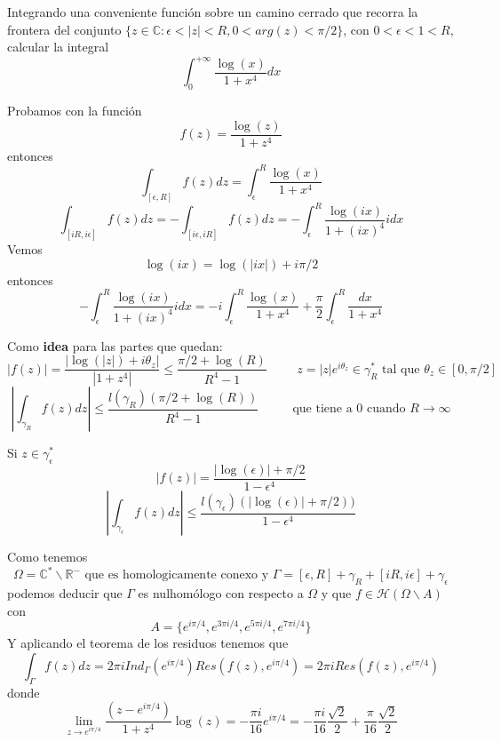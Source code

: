 \begin{ejer}
	Integrando una conveniente función sobre un camino cerrado que recorra la frontera del conjunto $\{ z\in\mathbb{C} : \epsilon < |z| < R, 0<arg(z)<\pi/2 \}$, con $0<\epsilon<1<R$, calcular la integral
	$$ \int_{0}^{+\infty} \frac{\log(x)}{1+x^4}dx $$
\end{ejer}
\begin{sol}
Probamos con la función
$$ f(z) = \frac{\log(z)}{1+z^4} $$
entonces
$$ \int_{[\epsilon, R]}f(z)dz = \int_{\epsilon}^{R} \frac{\log(x)}{1+x^4} $$
$$ \int_{[iR,i\epsilon]} f(z)dz = -\int_{[i\epsilon,iR]} f(z)dz = -\int_{\epsilon}^{R} \frac{\log(ix)}{1+(ix)^4} idx $$
Vemos
$$ \log(ix) = \log(|ix|)+i\pi/2 $$
entonces
$$ -\int_{\epsilon}^{R} \frac{\log(ix)}{1+(ix)^4} idx = -i\int_{\epsilon}^{R} \frac{\log(x)}{1+x^4} + \frac{\pi}{2} \int_{\epsilon}^{R} \frac{dx}{1+x^4} $$

Como \textbf{idea} para las partes que quedan:
$$ |f(z)| = \frac{|\log(|z|)+i\theta_z|}{|1+z^4|} \leq \frac{\pi/2+\log(R)}{R^4-1} \hspace{1cm} z=|z|e^{i\theta_z} \in\gamma_R^{\ast} \text{ tal que }\theta_z\in[0,\pi/2]$$
$$ \left| \int_{\gamma_R}f(z)dz \right| \leq \frac{l(\gamma_R)(\pi/2+\log(R))}{R^4-1} \hspace{1cm}\text{ que tiene a 0 cuando $R\rightarrow\infty$} $$

Si $z\in\gamma_{\epsilon}^{\ast}$
$$ |f(z)| = \frac{|\log(\epsilon)|+\pi/2}{1-\epsilon^4} $$
$$ \left| \int_{\gamma_{\epsilon}} f(z)dz \right| \leq \frac{l(\gamma_{\epsilon}) (|\log(\epsilon)|+\pi/2))}{1-\epsilon^4}  $$

Como tenemos
$$ \Omega = \mathbb{C}^{\ast}\backslash\mathbb{R}^- \text{ que es homologicamente conexo y }\Gamma = [\epsilon,R] +\gamma_R + [iR,i\epsilon] +\gamma_{\epsilon} $$
podemos deducir que
$\Gamma$ es nulhomólogo con respecto a $\Omega$ y que $f\in\mathcal{H}(\Omega\backslash A)$
con
$$ A = \{ e^{i\pi/4}, e^{3\pi i/4}, e^{5\pi i/4}, e^{7\pi i/4} \} $$
Y aplicando el teorema de los residuos tenemos que
$$ \int_{\Gamma}f(z)dz = 2\pi i Ind_{\Gamma}(e^{i\pi/4}) Res(f(z),e^{i\pi/4}) = 2\pi i Res(f(z),e^{i\pi/4}) $$
donde
$$ \lim_{z\rightarrow e^{i\pi/4}} \frac{(z-e^{i\pi/4})}{1+z^4}\log(z) = -\frac{\pi i}{16}e^{i\pi/4} = -\frac{\pi i}{16}\frac{\sqrt{2}}{2} + \frac{\pi}{16}\frac{\sqrt{2}}{2} $$
\end{sol}

